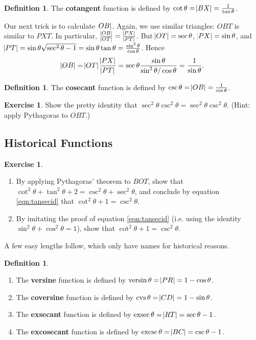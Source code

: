 \documentclass[a4paper,leqno]{article}
\numberwithin{equation}{section}
\theoremstyle{definition}
\newtheorem{defn}[equation]{Definition}
\newtheorem{exercise}[equation]{Exercise}
\theoremstyle{remark}
\newcommand{\df}[1]{\textbf{#1}}
\DeclareMathOperator{\versin}{versin}
\DeclareMathOperator{\cvs}{cvs}
\DeclareMathOperator{\exsec}{exsec}
\DeclareMathOperator{\excsc}{excsc}
\begin{document}
\begin{defn}
  The \df{cotangent} function is defined by $ \cot \theta = \abs{BX} = \frac{1}{\tan \theta} $.
\end{defn}

Our next trick is to calculate $ \abs{OB} $. Again, we use similar triangles: $ OBT $ is similar to $ PXT $. In
particular, $ \frac{\abs{OB}}{\abs{OT}} = \frac{\abs{PX}}{\abs{PT}} $. But $ \abs{OT} = \sec \theta $, $ \abs{PX} = \sin \theta $,
and $ \abs{PT} = \sin \theta \sqrt{\sec^2 \theta - 1} = \sin \theta \tan \theta = \frac{\sin^2 \theta}{\cos \theta} $. Hence
\begin{displaymath}
  \abs{OB} = \abs{OT} \frac{\abs{PX}}{\abs{PT}} = \sec \theta \frac{\sin \theta}{\sin^2 \theta/\cos \theta} = \frac{1}{\sin \theta}.
\end{displaymath}

\begin{defn}
  The \df{cosecant} function is defined by $ \csc \theta = \abs{OB} = \frac{1}{\sin \theta} $.
\end{defn}

\begin{exercise}
  Show the pretty identity that $ \sec^2 \theta \csc^2 \theta = \sec^2 \theta \csc^2 \theta $. (Hint: apply Pythagoras to $ OBT $.)
\end{exercise}

\subsection{Historical Functions}
\begin{exercise}\leavevmode
  \begin{enumerate}
    \item By applying Pythagoras' theorem to $ BOT $, show that $ \cot^2 \theta + \tan^2 \theta + 2 = \csc^2 \theta + \sec^2 \theta $,
          and conclude by equation \ref{eqn:tansecid} that $ \cot^2 \theta + 1 = \csc^2 \theta $.
    \item By imitating the proof of equation \ref{eqn:tansecid} (i.e. using the identity $ \sin^2 \theta + \cos^2 \theta = 1 $), show
          that $ \cot^2 \theta + 1 = \csc^2 \theta $.
  \end{enumerate}
\end{exercise}

A few easy lengths follow, which only have names for historical reasons.
\begin{defn}\leavevmode
  \begin{enumerate}
    \item The \df{versine} function is defined by $ \versin \theta = \abs{PR} = 1 - \cos \theta $.
    \item The \df{coversine} function is defined by $ \cvs \theta = \abs{CD} = 1 - \sin \theta $.
    \item The \df{exsecant} function is defined by $ \exsec \theta = \abs{RT} = \sec \theta - 1 $.
    \item The \df{excosecant} function is defined by $ \excsc \theta = \abs{BC} = \csc \theta - 1$.
  \end{enumerate}
\end{defn}
\end{document}

